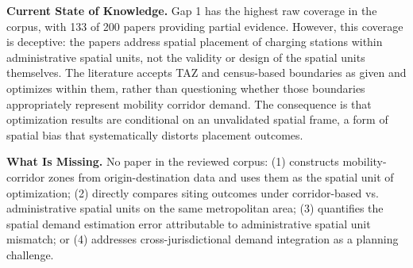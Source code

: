 \documentclass[letterpaper, 12pt, oneside, doublespacing]{Thesis}
\begin{document}
\noindent \textbf{Current State of Knowledge.} Gap 1 has the highest raw coverage in the corpus, with 133 of 200 papers providing partial evidence. However, this coverage is deceptive: the papers address spatial placement of charging stations within administrative spatial units, not the validity or design of the spatial units themselves. The literature accepts TAZ and census-based boundaries as given and optimizes within them, rather than questioning whether those boundaries appropriately represent mobility corridor demand. The consequence is that optimization results are conditional on an unvalidated spatial frame, a form of spatial bias that systematically distorts placement outcomes.



\noindent \textbf{What Is Missing.} No paper in the reviewed corpus: (1) constructs mobility-corridor zones from origin-destination data and uses them as the spatial unit of optimization; (2) directly compares siting outcomes under corridor-based vs. administrative spatial units on the same metropolitan area; (3) quantifies the spatial demand estimation error attributable to administrative spatial unit mismatch; or (4) addresses cross-jurisdictional demand integration as a planning challenge.
\end{document}
